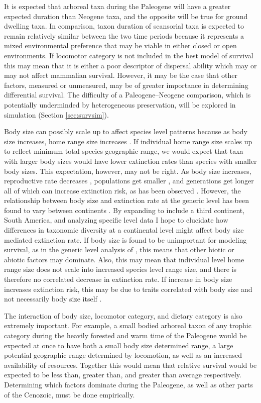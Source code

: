 \documentclass[12pt,letterpaper]{article}
\begin{document}
It is expected that arboreal taxa during the Paleogene will have a greater expected duration than Neogene taxa, and the opposite will be true for ground dwelling taxa. In comparison, taxon duration of scansorial taxa is expected to remain relatively similar between the two time periods because it represents a mixed environmental preference that may be viable in either closed or open environments. If locomotor category is not included in the best model of survival this may mean that it is either a poor descriptor of dispersal ability which may or may not affect mammalian survival. However, it may be the case that other factors, measured or unmeasured, may be of greater importance in determining differential survival. The difficulty of a Paleogene--Neogene comparison, which is potentially underminded by heterogeneous preservation, will be explored in simulation (Section \ref{sec:survsim}).

Body size can possibly scale up to affect species level patterns because as body size increases, home range size increases \citep{Damuth1979}. If individual home range size scales up to reflect minimum total species geographic range, we would expect that taxa with larger body sizes would have lower extinction rates than species with smaller body sizes. This expectation, however, may not be right. As body size increases, reproductive rate decreases \citep{Johnson2002b}, populations get smaller \citep{White2007}, and generations get longer \citep{Martin1993a} all of which can increase extinction risk, as has been observed \citep{Liow2008,Davidson2012}. However, the relationship between body size and extinction rate at the generic level has been found to vary between continents \citep{Tomiya2013,Liow2008}. By expanding to include a third continent, South America, and analyzing specific level data I hope to elucidate how differences in taxonomic diversity at a continental level might affect body size mediated extinction rate. If body size is found to be unimportant for modeling survival, as in the generic level analysis of \citet{Tomiya2013}, this means that other biotic or abiotic factors may dominate. Also, this may mean that individual level home range size does not scale into increased species level range size, and there is therefore no correlated decrease in extinction rate. If increase in body size increases extinction risk, this may be due to traits correlated with body size and not necessarily body size itself \citep{Johnson2002b}.

The interaction of body size, locomotor category, and dietary category is also extremely important. For example, a small bodied arboreal taxon of any trophic category during the heavily forested and warm time of the Paleogene would be expected at once to have both a small body size determined range, a large potential geographic range determined by locomotion, as well as an increased availability of resources. Together this would mean that relative survival would be expected to be less than, greater than, and greater than average respectively. Determining which factors dominate during the Paleogene, as well as other parts of the Cenozoic, must be done empirically.
\end{document}
